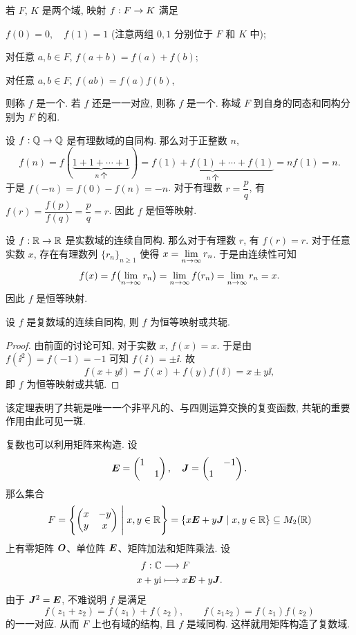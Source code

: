 若 $F$, $K$ 是两个域, 映射 $f:F\rightarrow K$ 满足
\begin{enuma}
  \item $f(0)=0,\quad f(1)=1$ (注意两组 $0,1$ 分别位于 $F$ 和 $K$ 中);
  \item 对任意 $a,b\in F$, $f(a+b)=f(a)+f(b)$;
  \item 对任意 $a,b\in F$, $f(ab)=f(a)f(b)$,
\end{enuma}\parnoindent
则称 $f$ 是一个.
若 $f$ 还是一一对应, 则称 $f$ 是一个.
称域 $F$ 到自身的同态和同构分别为 $F$ 的和.

\begin{exampleenum}
  \item 设 $f:{\mathbb{Q}}\rightarrow{\mathbb{Q}}$ 是有理数域的自同构. 那么对于正整数 $n$,
  \[
      f(n)
    =f(\underbrace{1+1+\cdots+1}_{n\ \text{个}})
    =\underbrace{f(1)+f(1)+\cdots+f(1)}_{n\ \text{个}}
    =nf(1)=n.
  \]
  于是 $f(-n)=f(0)-f(n)=-n$.
  对于有理数 $r=\dfrac pq$, 有 $f(r)=\dfrac{f(p)}{f(q)}=\dfrac pq=r$.
  因此 $f$ 是恒等映射.
  \item 设 $f:{\mathbb{R}}\rightarrow{\mathbb{R}}$ 是实数域的连续自同构. 那么对于有理数 $r$, 有 $f(r)=r$.
  对于任意实数 $x$, 存在有理数列 $\{r_n\}_{n\ge 1}$ 使得 $x=\lim\limits_{n\rightarrow\infty} r_n$.
  于是由连续性可知
  \[
      f(x)
    =f\bigl(\lim_{n\rightarrow\infty} r_n\bigr)
    =\lim_{n\rightarrow\infty} f(r_n)
    =\lim_{n\rightarrow\infty} r_n
    =x.
  \]
  因此 $f$ 是恒等映射.
\end{exampleenum}

\begin{theorem}
  设 $f$ 是复数域的连续自同构, 则 $f$ 为恒等映射或共轭.
\end{theorem}

\begin{proof}
  由前面的讨论可知, 对于实数 $x$, $f(x)=x$.
  于是由 $f(\ii^2)=f(-1)=-1$ 可知 $f(\ii)=\pm\ii$.
  故
  \[
    f(x+y\ii)=f(x)+f(y)f(\ii)=x\pm y\ii,
  \]
  即 $f$ 为恒等映射或共轭.
\end{proof}

该定理表明了共轭是唯一一个非平凡的、与四则运算交换的复变函数, 共轭的重要作用由此可见一斑.

复数也可以利用矩阵来构造.
设
\[
  {\boldsymbol{E}}=\begin{pmatrix}1& \\&1\end{pmatrix},\quad
  {\boldsymbol{J}}=\begin{pmatrix}&-1\\1&\end{pmatrix}.
\]
那么集合
\[
  F=\Biggl\{\begin{pmatrix}
    x&-y\\y&x
  \end{pmatrix}\Biggm\vert x,y\in{\mathbb{R}}\Biggr\}
  =\{x{\boldsymbol{E}}+y{\boldsymbol{J}}\mid x,y\in{\mathbb{R}}\}
  \subseteq M_2({\mathbb{R}})
\]
上有零矩阵 ${\boldsymbol{O}}$、单位阵 ${\boldsymbol{E}}$、矩阵加法和矩阵乘法.
设
\begin{align*}
  f:{\mathbb{C}}&\longrightarrow F\\
  x+y\mathrm{i}&\longmapsto x{\boldsymbol{E}}+y{\boldsymbol{J}}.
\end{align*}
由于 ${\boldsymbol{J}}^2={\boldsymbol{E}}$, 不难说明 $f$ 是满足
\[
  f(z_1+z_2)=f(z_1)+f(z_2),\qquad
  f(z_1z_2)=f(z_1)f(z_2)
\]
的一一对应.
从而 $F$ 上也有域的结构, 且 $f$ 是域同构.
这样就用矩阵构造了复数域.

